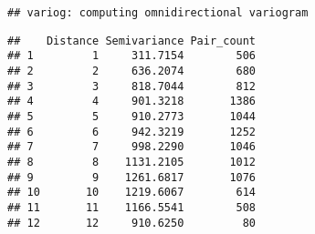 \documentclass[]{book}
\newenvironment{Shaded}{\begin{snugshade}}{\end{snugshade}}
\newcommand{\CommentTok}[1]{\textcolor[rgb]{0.56,0.35,0.01}{\textit{#1}}}
\newcommand{\DataTypeTok}[1]{\textcolor[rgb]{0.13,0.29,0.53}{#1}}
\newcommand{\KeywordTok}[1]{\textcolor[rgb]{0.13,0.29,0.53}{\textbf{#1}}}
\newcommand{\NormalTok}[1]{#1}
\newcommand{\OperatorTok}[1]{\textcolor[rgb]{0.81,0.36,0.00}{\textbf{#1}}}
\newcommand{\StringTok}[1]{\textcolor[rgb]{0.31,0.60,0.02}{#1}}
\begin{document}
\begin{verbatim}
## variog: computing omnidirectional variogram
\end{verbatim}

\begin{Shaded}
\end{Shaded}

\begin{verbatim}
##    Distance Semivariance Pair_count
## 1         1     311.7154        506
## 2         2     636.2074        680
## 3         3     818.7044        812
## 4         4     901.3218       1386
## 5         5     910.2773       1044
## 6         6     942.3219       1252
## 7         7     998.2290       1046
## 8         8    1131.2105       1012
## 9         9    1261.6817       1076
## 10       10    1219.6067        614
## 11       11    1166.5541        508
## 12       12     910.6250         80
\end{verbatim}
\end{document}
